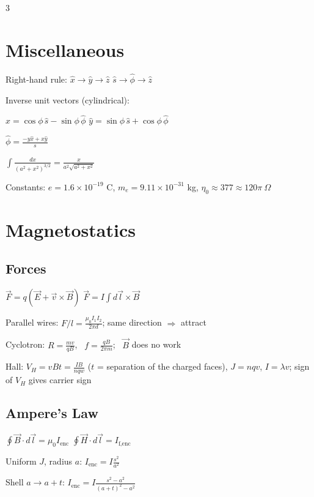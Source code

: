 \documentclass[11pt]{article}
\begin{document}
\normalsize
\raggedright

\begin{multicols*}{3}

\section*{Miscellaneous}

Right-hand rule:
$\hat x \to \hat y \to \hat z$ \hfill $\hat s \to \hat \phi \to \hat z$

Inverse unit vectors (cylindrical):

$\hat x=\cos\phi\,\hat s-\sin\phi\,\hat\phi$ \hfill $\hat y=\sin\phi\,\hat s+\cos\phi\,\hat\phi$

$\hat\phi=\frac{-y\hat x+x\hat y}{s}$

$\displaystyle\int\frac{dx}{(a^2+x^2)^{3/2}}=\frac{x}{a^2\sqrt{a^2+x^2}}$

Constants: $e=1.6\times10^{-19}$ C, $m_e=9.11\times10^{-31}$ kg, $\eta_0\approx377\approx120\pi\ \Omega$

\section*{Magnetostatics}

\subsection*{Forces}

$\vec F=q(\vec E+\vec v\times\vec B)$ \hfill $\vec F=I\int d\vec l\times\vec B$

Parallel wires: $F/l=\frac{\mu_0I_1I_2}{2\pi d}$; same direction $\Rightarrow$ attract

Cyclotron: $R=\frac{mv}{qB}$, \ $f=\frac{qB}{2\pi m}$; \ $\vec B$ does no work

Hall: $V_H=vBt=\frac{IB}{nqw}$ ($t$ = separation of the charged faces), $J=nqv$, $I=\lambda v$; sign of $V_H$ gives carrier sign

\subsection*{Ampere's Law}

$\oint\vec B\cdot d\vec l = \mu_0I_\text{enc}$ \hfill $\oint\vec H\cdot d\vec l = I_\text{f,enc}$

Uniform $J$, radius $a$: $I_\text{enc}=I\frac{s^2}{a^2}$

Shell $a\to a+t$: $I_\text{enc}=I\frac{s^2-a^2}{(a+t)^2-a^2}$


\end{multicols*}
\end{document}
